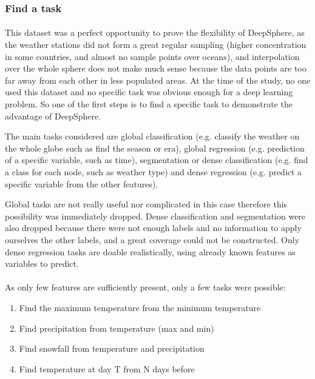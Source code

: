 \documentclass[11pt]{report}
\begin{document}
\subsubsection{Find a task}
\paragraph*{}
This dataset was a perfect opportunity to prove the flexibility of DeepSphere, as the weather stations did not form a great regular sampling (higher concentration in some countries, and almost no sample points over oceans), and interpolation over the whole sphere does not make much sense because the data points are too far away from each other in less populated areas. At the time of the study, no one used this dataset and no specific task was obvious enough for a deep learning problem. So one of the first steps is to find a specific task to demonstrate the advantage of DeepSphere.

The main tasks considered are global classification (e.g. classify the weather on the whole globe such as find the season or era), global regression (e.g. prediction of a specific variable, such as time), segmentation or dense classification (e.g. find a class for each node, such as weather type) and dense regression (e.g. predict a specific variable from the other features).

Global tasks are not really useful nor complicated in this case therefore this possibility was immediately dropped. Dense classification and segmentation were also dropped because there were not enough labels and no information to apply ourselves the other labels, and a great coverage could not be constructed. Only dense regression tasks are doable realistically, using already known features as variables to predict.

\paragraph*{}
As only few features are sufficiently present, only a few tasks were possible:
\begin{enumerate}
    \item Find the maximum temperature from the minimum temperature
    \item Find precipitation from temperature (max and min)
    \item Find snowfall from temperature and precipitation
    \item Find temperature at day T from N days before
\end{enumerate}
\end{document}
